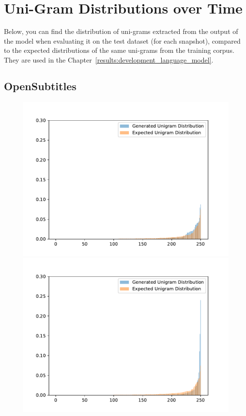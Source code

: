 \chapter{Uni-Gram Distributions over Time}
\label{appendix:unigram_distributions}

Below, you can find the distribution of uni-grams extracted from the output of the model when evaluating it on the test dataset (for each snapshot), compared to the expected distributions of the same uni-grams from the training corpus. They are used in the Chapter~\ref{results:development_language_model}.

\section{OpenSubtitles}
\begin{figure}[H]
  \includegraphics[width=\linewidth]{img/plots/opensubtitles_not_reversed/unigram_distribution_comparison_step_500000.pdf}
  \centering
  \small
  \endminipage\hfill
  \includegraphics[width=\linewidth]{img/plots/opensubtitles_not_reversed/unigram_distribution_comparison_step_1000000.pdf}

\end{figure}
